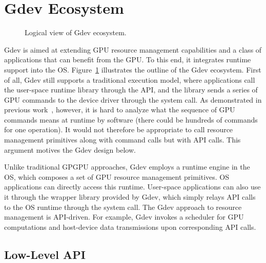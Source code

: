 \section{Gdev Ecosystem}
\label{sec:overview}

\begin{figure}[t]
 \begin{center}
  \caption{Logical view of Gdev ecosystem.}
  \label{fig:gdev}
 \end{center}
 \vspace{-1em}
\end{figure}

Gdev is aimed at extending GPU resource management capabilities and a
class of applications that can benefit from the GPU.
To this end, it integrates runtime support into the OS.
Figure~\ref{fig:gdev} illustrates the outline of the Gdev ecosystem.
First of all, Gdev still supports a traditional execution model, where
applications call the user-space runtime library through the API, and
the library sends a series of GPU commands to the device driver through
the system call.
As demonstrated in previous work~\cite{Kato_ATC11}, however, it is hard
to analyze what the sequence of GPU commands means at runtime by
software (there could be hundreds of commands for one operation).
It would not therefore be appropriate to call resource management
primitives along with command calls but with API calls.
This argument motives the Gdev design below.

Unlike traditional GPGPU approaches, Gdev employs a runtime engine in
the OS, which composes a set of GPU resource management primitives.
OS applications can directly access this runtime.
User-space applications can also use it through the wrapper library provided by
Gdev, which simply relays API calls to the OS runtime through the system
call.
The Gdev approach to resource management is API-driven.
For example, Gdev invokes a scheduler for GPU computations and
host-device data transmissions upon corresponding API calls.

\subsection{Low-Level API}
\label{sec:low_level_api}

